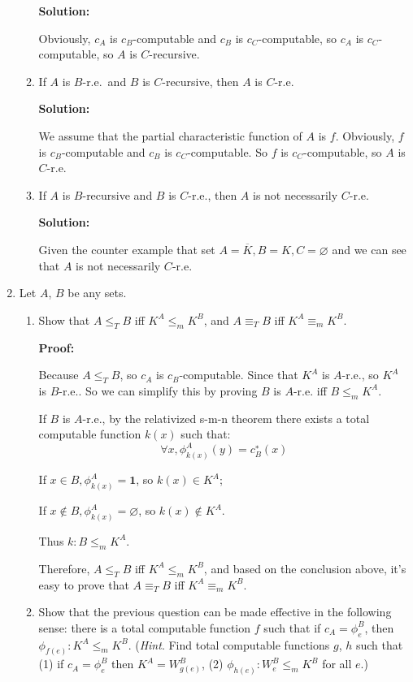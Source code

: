 \documentclass[12pt,a4paper]{article}
\theoremstyle{definition}
\numberwithin{equation}{section}
\numberwithin{figure}{section}
\begin{document}
\begin{enumerate}
\begin{enumerate}
\textbf{Solution:}

Obviously, $c_A$ is $c_B$-computable and $c_B$ is $c_C$-computable, so $c_A$ is $c_C$-computable, so $A$ is $C$-recursive.

\item If $A$ is $B$-r.e.~and $B$ is $C$-recursive, then $A$ is $C$-r.e.

\textbf{Solution:}

We assume that the partial characteristic function of $A$ is $f$. Obviously, $f$ is $c_B$-computable and $c_B$ is $c_C$-computable. So $f$ is $c_C$-computable, so $A$ is $C$-r.e.
 
\item If $A$ is $B$-recursive and $B$ is $C$-r.e., then $A$ is not necessarily $C$-r.e.

\textbf{Solution:}

Given the counter example that set $A = \overline{K} , B = K , C = \varnothing $ and we can see that $A$ is not necessarily $C$-r.e.
\end{enumerate}

  \item Let $A$, $B$ be any sets.
    \begin{enumerate}
    \item Show that $A\leq_T B$ iff $K^A\leq_m K^B$, and $A\equiv_T B$ iff $K^A\equiv_m K^B$.
    
    \textbf{Proof:}
    
    Because $A \leq_T B$, so $c_A$ is $c_B$-computable. Since that $K^A$ is $A$-r.e., so $K^A$ is $B$-r.e.. So we can simplify this by proving $B$ is $A$-r.e. iff $B \leq_m K^A$.
    
    If $B$ is $A$-r.e., by the relativized s-m-n theorem there exists a total computable function $k(x)$ such that:
     $$\forall x,\phi^A_{k(x)}(y)=c^{∗}_{B}(x)$$
     
    If $x \in B, \phi^A_{k(x)} = \mathbf{1}$, so $k(x) \in K^A$; 
    
    If $x \notin B, \phi^A_{k(x)} = \varnothing$, so $k(x) \notin  K^A$.
    
     Thus $k : B \leq_m K^A$.
     
     Therefore, $A\leq_T B$ iff $K^A\leq_m K^B$, and based on the conclusion above, it's easy to prove that $A\equiv_T B$ iff $K^A\equiv_m K^B$.
    
    
    \item Show that the previous question can be made effective in the following sense: there is a total computable function $f$ such that if $c_A=\phi_e^B$, then $\phi_{f(e)}:K^A\leq_m K^B$. (\emph{Hint}. Find total computable functions $g$, $h$ such that (1) if $c_A=\phi_e^B$ then $K^A=W_{g(e)}^B$, (2) $\phi_{h(e)}:W_e^B\leq_mK^B$ for all $e$.) \label{Kfunction}
    

\end{enumerate}
\end{enumerate}
\end{document}
